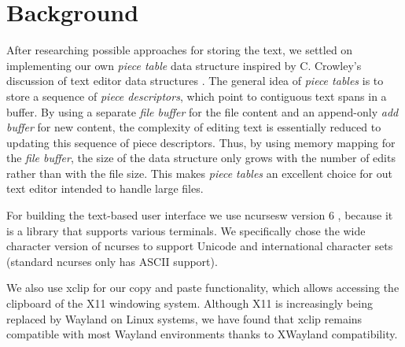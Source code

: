 \section{Background}\label{sec:bg}

After researching possible approaches for storing the text, we settled on implementing our own \textit{piece table} data structure inspired by C. Crowley's discussion of text editor data structures \cite{crowley1998data}. The general idea of \textit{piece tables} is to store a sequence of \textit{piece descriptors}, which point to contiguous text spans in a buffer. By using a separate \textit{file buffer} for the file content and an append-only \textit{add buffer} for new content, the complexity of editing text is essentially reduced to updating this sequence of piece descriptors. Thus, by using memory mapping for the \textit{file buffer}, the size of the data structure only grows with the number of edits rather than with the file size. This makes \textit{piece tables} an excellent choice for out text editor intended to handle large files.
\par
\smallskip
For building the text-based user interface we use ncursesw version 6 \cite{ncursesw}, because it is a library that supports various terminals. We specifically chose the wide character version of ncurses to support Unicode and international character sets (standard ncurses only has ASCII support).
\par
\smallskip
We also use xclip \cite{xclip} for our copy and paste functionality, which allows accessing the clipboard of the X11 windowing system. Although X11 is increasingly being replaced by Wayland on Linux systems, we have found that xclip remains compatible with most Wayland environments thanks to XWayland compatibility.